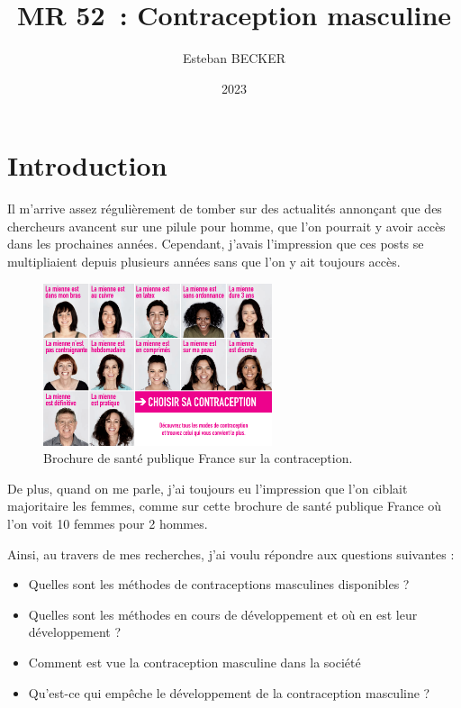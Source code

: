 \documentclass[12pt,a4paper]{report}
\title{MR 52 : Contraception masculine}
\author{Esteban BECKER}
\date{2023}
\begin{document}
\maketitle
\tableofcontents
\chapter*{Introduction}

Il m'arrive assez régulièrement de tomber sur des actualités annonçant que des chercheurs avancent sur une pilule pour homme, que l'on pourrait y avoir accès dans les prochaines années. Cependant, j'avais l'impression que ces posts se multipliaient depuis plusieurs années sans que l'on y ait toujours accès.
\begin{figure}[h]
    \centering
    \includegraphics[width=0.6\textwidth]{images/intro/choisir-sa-contraception.png}
    \caption{Brochure de santé publique France sur la contraception. \cite{santepublicfranceChoisirSaContraception2019}}
    \label{fig:brochureSPF}
\end{figure}
De plus, quand on me parle, j'ai toujours eu l'impression que l'on ciblait majoritaire les femmes, comme sur cette brochure de santé publique France où l'on voit 10 femmes pour 2 hommes. \cite{santepublicfranceChoisirSaContraception2019}

Ainsi, au travers de mes recherches, j'ai voulu répondre aux questions suivantes : \begin{itemize}
    \item Quelles sont les méthodes de contraceptions masculines disponibles ?
    \item Quelles sont les méthodes en cours de développement et où en est leur développement ?
    \item Comment est vue la contraception masculine dans la société
    \item Qu'est-ce qui empêche le développement de la contraception masculine ?
\end{itemize}
\end{document}
